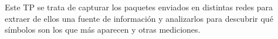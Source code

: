 Este TP se trata de capturar los paquetes enviados en distintas redes para extraer
de ellos una fuente de información y analizarlos para descubrir qué símbolos
son los que más aparecen y otras mediciones.

\blindtext